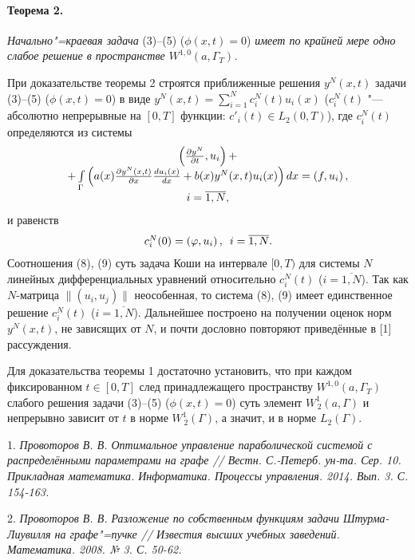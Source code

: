 \paragraph{Теорема 2.} \emph{Начально"=краевая задача} (3)--(5) ($\phi(x,t)=0$) \emph{имеет по крайней мере одно слабое решение в пространстве $W^{1,0}(a,\Gamma_{T})$.}

При доказательстве теоремы 2 строятся приближенные решения $y^N(x,t)$ задачи (3)--(5) ($\phi(x,t)=0$) в виде $y^N(x,t)=\sum\limits_{i=1}^Nc_i^N(t)u_i(x)$ ($c_i^N(t)$ "--- абсолютно непрерывные на $[0,T]$ функции: $c'_i(t)\in L_2(0,T)$), где $c_i^N(t)$ определяются  из системы
\begin{equation}\label{eq9}
{{\begin{array}{*{20}c}
\left(\frac{\partial y^N}{\partial t},u_i\right)+\\
+\int\limits_{\Gamma}\left(a(x)\frac{\partial y^N(x,t)}{\partial x}\frac{d u_i(x)}{d x}+b(x)y^N(x,t)u_i(x)\right)dx=
\left({f},u_i\right),\\i=\overline{1,N},
 \end{array} }}
\end{equation}
и равенств
\begin{equation}\label{eq10}
{{\begin{array}{*{20}c}
c_i^N(0)=\left({\varphi},u_i\right),\,\,\,i=\overline{1,N}.
 \end{array} }}
\end{equation}
Соотношения (8), (9) суть задача Коши на интервале $[0,T)$  для системы $N$ линейных дифференциальных уравнений относительно $c_i^N(t)$ ($i=\overline{1,N}$). Так как  $N$-матрица $\|(u_i,u_j)\|$  неособенная, то система (8), (9) имеет единственное решение $c_i^N(t)$ ($i=\overline{1,N}$). Дальнейшее построено на получении оценок норм $y^N(x,t)$, не зависящих от $N$, и почти дословно повторяют приведённые в [1] рассуждения.

Для доказательства теоремы 1 достаточно установить, что при каждом фиксированном $t\in [0,T]$ след принадлежащего пространству $W^{1,0}(a,\Gamma_{T})$ слабого решения задачи (3)--(5) ($\phi(x,t)=0$) суть элемент $W_{\,2}^{1}(a,\Gamma)$ и непрерывно зависит от $t$ в норме $W_{\,2}^{1}(\Gamma)$, а значит, и в норме $L_2(\Gamma)$.


\litlist

1. \it Провоторов В. В. \rm Оптимальное управление параболической системой с распределёнными параметрами на графе // Вестн. С.-Петерб. ун-та. Сер. 10. Прикладная математика. Информатика. Процессы управления. 2014. Вып. 3. С. 154-163.

2. \it Провоторов В. В. \rm Разложение по собственным функциям задачи Штурма-Лиувилля на графе"=пучке // Известия высших учебных заведений. Математика. 2008. № 3. С. 50-62.
